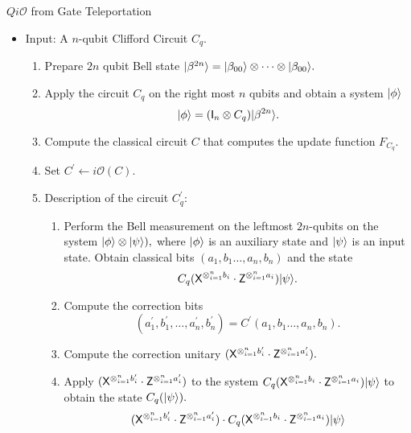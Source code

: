 \begin{algorithm}[]
\label{QiO:Clifford-teleportation}
   \caption{$Qi\mathcal{O}$ from Gate Teleportation}
  \begin{itemize}
  \item Input: A $n$-qubit Clifford Circuit $C_q.$
  \begin{enumerate}
  \item Prepare $2n$ qubit Bell state ${\lvert}\beta^{ 2n}\rangle={\lvert}\beta_{00}\rangle\otimes \cdots \otimes {\lvert}\beta_{00}\rangle.$
  \item Apply the circuit $C_q$ on the right most $n$ qubits and obtain a system ${\lvert}\phi\rangle$
  										 $${\lvert}\phi\rangle=({\sf I}_n\otimes C_q) {\lvert}\beta^{2n}\rangle.$$
 \item Compute the classical circuit $C$ that computes the update function $F_{C_q}.$	
 \item Set $C^\prime\leftarrow i\mathcal{O}(C).$							
  \item Description of the circuit  $C_q^\prime:$
    \begin{enumerate}
     \item  Perform the Bell measurement on the leftmost $2n$-qubits on the system ${\lvert}\phi\rangle\otimes {\lvert}\psi\rangle),$ where ${\lvert}\phi\rangle$ is an auxiliary state and ${\lvert}\psi\rangle$ is an input state. Obtain classical bits $(a_1,b_1\ldots,a_n,b_n)$ and the state
     \begin{equation}
     \label{eq:last}
      C_q({\sf X}^{\otimes_{i=1}^{n} b_{i}} \cdot {\sf Z}^{\otimes_{i=1}^{n} a_{i}}){\lvert}\psi\rangle.
      \end{equation}
     \item Compute the correction bits
      \begin{equation}
     \label{eq:last1}
  (a_1^\prime, b_1^\prime,\ldots, a_n^\prime, b_n^\prime)=C^\prime(a_1,b_1\ldots,a_n,b_n).
  \end{equation}
     \item Compute the correction unitary $({\sf X}^{\otimes_{i=1}^{n} b_{i}^\prime} \cdot {\sf Z}^{\otimes_{i=1}^{n} a_{i}^\prime}).$
     \item Apply  $({\sf X}^{\otimes_{i=1}^{n} b_{i}^\prime} \cdot {\sf Z}^{\otimes_{i=1}^{n} a_{i}^\prime})$ to the system $C_q({\sf X}^{\otimes_{i=1}^{n} b_{i}} \cdot {\sf Z}^{\otimes_{i=1}^{n} a_{i}}){\lvert}\psi\rangle$ to obtain the state $C_q({\lvert}\psi\rangle).$
     \begin{equation*}
  \begin{aligned}
 (\xgate^{\otimes_{i=1}^{n} b_{i}^\prime} \cdot \zgate^{\otimes_{i=1}^{n} a_{i}^\prime}) \cdot C_q(\xgate^{\otimes_{i=1}^{n} b_{i}} \cdot \zgate^{\otimes_{i=1}^{n}a_{i}})\ket{\psi}\\

\end{aligned}
\end{equation*}
\end{enumerate}
\end{enumerate}
\end{itemize}
\end{algorithm}
